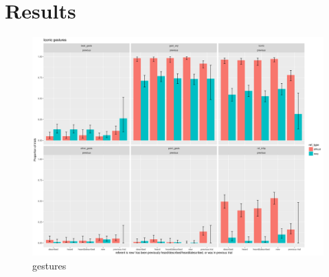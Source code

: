\documentclass[a4paper,man,natbib]{apa6}
\begin{document}
\section{Results}
\begin{figure}
  \centering
	\includegraphics[width=\linewidth]{previousplot.png}
  \caption{gestures}
  \label{fig:plot}
\end{figure}







\end{document}
